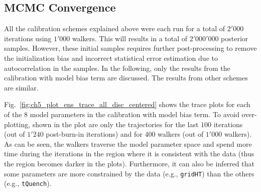 \subsection{MCMC Convergence}\label{sub:bc_mcmc_convergence}

All the calibration schemes explained above were each run for a total of $2'000$ iterations using $1'000$ walkers. 
This will results in a total of $2'000'000$ posterior samples.
However, these initial samples requires further post-processing to remove the initialization bias and incorrect statistical error estimation due to autocorrelation in the samples.
In the following, only the results from the calibration with model bias term are discussed.
The results from other schemes are similar.

Fig.~\ref{fig:ch5_plot_ens_trace_all_disc_centered} shows the trace plots for each of the $8$ model parameters in the calibration with model bias term.
To avoid over-plotting, shown in the plot are only the trajectories for the last $100$ iterations (out of $1'240$ post-burn-in iterations) and for $400$ walkers (out of $1'000$ walkers). 
As can be seen, the walkers traverse the model parameter space and spend more time during the iterations in the region where it is consistent with the data (thus the region becomes darker in the plots).
Furthermore, it can also be inferred that some parameters are more constrained by the data (e.g., \texttt{gridHT}) than the others (e.g., \texttt{tQuench}).

